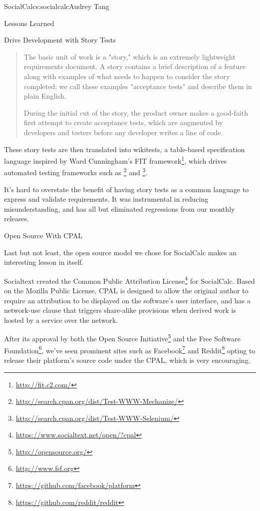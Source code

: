 \begin{aosachapter}{SocialCalc}{s:socialcalc}{Audrey Tang}
\begin{aosasect1}{Lessons Learned}
\begin{aosasect2}{Drive Development with Story Tests}
\begin{quotation}

  The basic unit of work is a "story," which is an extremely
  lightweight requirements document. A story contains a brief
  description of a feature along with examples of what needs to happen
  to consider the story completed; we call these examples "acceptance
  tests" and describe them in plain English.

  During the initial cut of the story, the product owner makes a
  good-faith first attempt to create acceptance tests, which are
  augmented by developers and testers before any developer writes
  a line of code.

\end{quotation}

These story tests are then translated into wikitests, a table-based
specification language inspired by Ward Cunningham's FIT
framework\footnote{\url{http://fit.c2.com/}}, which drives automated
testing frameworks such as
\footnote{\url{http://search.cpan.org/dist/Test-WWW-Mechanize/}}
and
\footnote{\url{http://search.cpan.org/dist/Test-WWW-Selenium/}}.

It's hard to overstate the benefit of having story tests as a common
language to express and validate requirements. It was instrumental in
reducing misunderstanding, and has all but eliminated regressions from
our monthly releases.

\end{aosasect2}


\begin{aosasect2}{Open Source With CPAL}

Last but not least, the open source model we chose for SocialCalc
makes an interesting lesson in itself.


Socialtext created the Common Public Attribution
License\footnote{\url{https://www.socialtext.net/open/?cpal}} for
SocialCalc.  Based on the Mozilla Public License, CPAL is designed to
allow the original author to require an attribution to be displayed
on the software's user interface, and has a network-use clause that
triggers share-alike provisions when derived work is hosted by a
service over the network.


After its approval by both the Open Source
Initiative\footnote{\url{http://opensource.org/}} and the Free
Software Foundation\footnote{\url{http://www.fsf.org}}, we've seen prominent
sites such as Facebook\footnote{\url{https://github.com/facebook/platform}}
and Reddit\footnote{\url{https://github.com/reddit/reddit}} opting to release
their platform's source code under the CPAL, which is very
encouraging.


\end{aosasect2}
\end{aosasect1}
\end{aosachapter}
